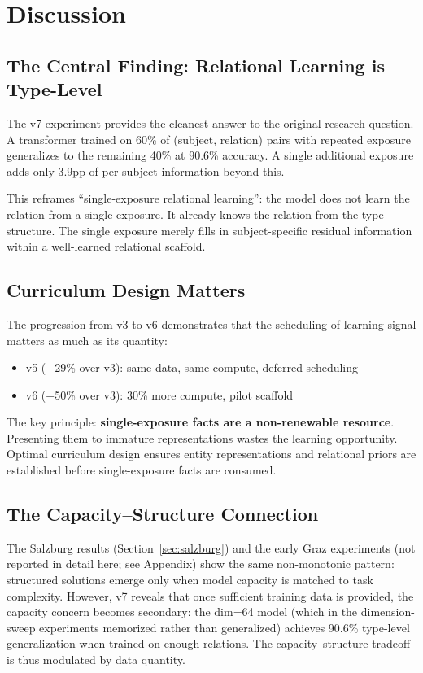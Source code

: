 \documentclass[11pt]{article}
\begin{document}
\section{Discussion}
\label{sec:discussion}

\subsection{The Central Finding: Relational Learning is Type-Level}

The v7 experiment provides the cleanest answer to the original research question.
A transformer trained on 60\% of (subject, relation) pairs with repeated exposure
generalizes to the remaining 40\% at 90.6\% accuracy.  A single additional exposure
adds only 3.9pp of per-subject information beyond this.

This reframes ``single-exposure relational learning'': the model does not learn the
relation from a single exposure.  It already knows the relation from the type structure.
The single exposure merely fills in subject-specific residual information within a
well-learned relational scaffold.

\subsection{Curriculum Design Matters}

The progression from v3 to v6 demonstrates that the scheduling of learning signal
matters as much as its quantity:
\begin{itemize}
\item v5 (+29\% over v3): same data, same compute, deferred scheduling
\item v6 (+50\% over v3): 30\% more compute, pilot scaffold
\end{itemize}
The key principle: \textbf{single-exposure facts are a non-renewable resource}.
Presenting them to immature representations wastes the learning opportunity.  Optimal
curriculum design ensures entity representations and relational priors are established
before single-exposure facts are consumed.

\subsection{The Capacity--Structure Connection}

The Salzburg results (Section~\ref{sec:salzburg}) and the early Graz experiments
(not reported in detail here; see Appendix) show the same non-monotonic pattern:
structured solutions emerge only when model capacity is matched to task complexity.
However, v7 reveals that once sufficient training data is provided, the
capacity concern becomes secondary: the dim=64 model (which in the dimension-sweep
experiments memorized rather than generalized) achieves 90.6\% type-level
generalization when trained on enough relations.  The capacity--structure tradeoff
is thus modulated by data quantity.
\end{document}
